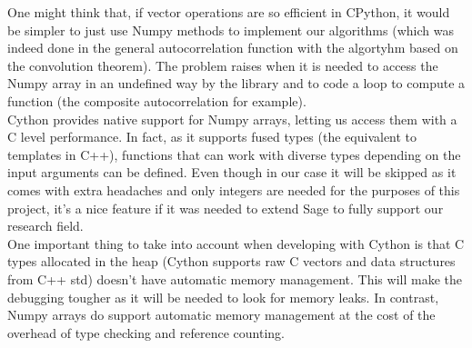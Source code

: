 One might think that, if vector operations are so efficient in CPython, it would
be simpler to just use Numpy methods to implement our algorithms (which was
indeed done in the general autocorrelation function with the algortyhm
based on the convolution theorem). The problem raises when it is needed to
access the Numpy array in an undefined way by the library and to code a loop to
compute a function (the composite autocorrelation for example).\\

Cython provides native support for Numpy arrays, letting us access them with a
C level performance. In fact, as it supports fused types (the equivalent to
templates in C++), functions that can work with diverse types
depending on the input arguments can be defined. Even though in our case it will
be skipped as it comes with extra headaches and only integers are needed for the
purposes of this project, it's a nice feature if it was needed to extend Sage to
fully support our research field.\\

One important thing to take into account when developing with Cython is that
C types allocated in the heap (Cython supports raw C vectors and data structures
from C++ std) doesn't have automatic memory management. This will make the
debugging tougher as it will be needed to look for memory leaks. In contrast,
Numpy arrays do support automatic memory management at the cost of the overhead
of type checking and reference counting.\\
